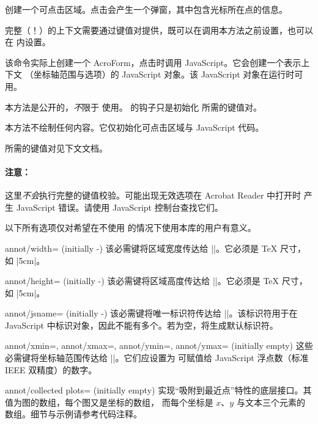 \begin{command}{\pgfplotsclickablecreate{}}
    创建一个可点击区域。点击会产生一个弹窗，其中包含光标所在点的信息。

    完整（！）的上下文需要通过键值对提供，既可以在调用本方法之前设置，也可以在
     内设置。

    该命令实际上创建一个 AcroForm，点击时调用 JavaScript。它会创建一个表示上下文
    （坐标轴范围与选项）的 JavaScript 对象。该 JavaScript 对象在运行时可用。

    本方法是公开的，\emph{不}限于 \PGFPlots{} 使用。\PGFPlots{} 的钩子只是初始化
    所需的键值对。

    本方法不绘制任何内容。它仅初始化可点击区域与 JavaScript 代码。

    所需的键值对见下文文档。

    \paragraph{注意：}

    这里\emph{不会}执行完整的键值校验。可能出现无效选项在 Acrobat Reader 中打开时
    产生 JavaScript 错误。请使用 JavaScript 控制台查找它们。
\end{command}

\noindent 以下所有选项仅对希望在不使用 \PGFPlots{} 的情况下使用本库的用户有意义。

\begin{pgfplotskey}{annot/width= (initially -)}
    该必需键将区域宽度传达给 |\pgfplotsclickablecreate|。它必须是 \TeX{} 尺寸，
    如 |5cm|。
\end{pgfplotskey}

\begin{pgfplotskey}{annot/height= (initially -)}
    该必需键将区域高度传达给 |\pgfplotsclickablecreate|。它必须是 \TeX{} 尺寸，
    如 |5cm|。
\end{pgfplotskey}

\begin{pgfplotskey}{annot/jsname= (initially -)}
    该必需键将唯一标识符传达给 |\pgfplotsclickablecreate|。该标识符用于在
    JavaScript 中标识对象，因此不能有多个。若为空，将生成默认标识符。
\end{pgfplotskey}

\begin{pgfplotskeylist}{%
    annot/xmin=,
    annot/xmax=,
    annot/ymin=,
    annot/ymax= (initially empty)%
}
    这些必需键将坐标轴范围传达给 |\pgfplotsclickablecreate|。它们应设置为
    可赋值给 JavaScript 浮点数（标准 IEEE 双精度）的数字。
\end{pgfplotskeylist}

\begin{pgfplotskey}{annot/collected plots= (initially empty)}
    实现“吸附到最近点”特性的底层接口。其值为图的数组，每个图又是坐标的数组，
    而每个坐标是 $x$、$y$ 与文本三个元素的数组。细节与示例请参考代码注释。
\end{pgfplotskey}
\endgroup
